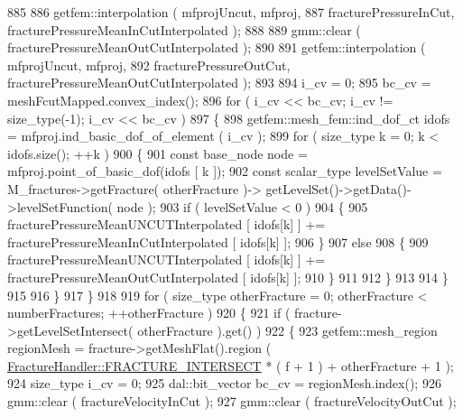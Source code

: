 \begin{DoxyCode}
885 
886                 getfem::interpolation ( mfprojUncut, mfproj,
887                                         fracturePressureInCut, fracturePressureMeanInCutInterpolated );
888 
889                 gmm::clear ( fracturePressureMeanOutCutInterpolated );
890 
891                 getfem::interpolation ( mfprojUncut, mfproj,
892                                         fracturePressureOutCut, fracturePressureMeanOutCutInterpolated );
893 
894                 i\_cv = 0;
895                 bc\_cv = meshFcutMapped.convex\_index();
896                 \textcolor{keywordflow}{for} ( i\_cv << bc\_cv; i\_cv != size\_type(-1); i\_cv << bc\_cv )
897                 \{
898                     getfem::mesh\_fem::ind\_dof\_ct idofs = mfproj.ind\_basic\_dof\_of\_element ( i\_cv );
899                     \textcolor{keywordflow}{for} ( size\_type k = 0; k < idofs.size(); ++k )
900                     \{
901                         \textcolor{keyword}{const} base\_node node = mfproj.point\_of\_basic\_dof(idofs [ k ]);
902                         \textcolor{keyword}{const} scalar\_type levelSetValue = M\_fractures->getFracture( otherFracture )->
      getLevelSet()->getData()->levelSetFunction( node );
903                         \textcolor{keywordflow}{if} ( levelSetValue < 0 )
904                         \{
905                             fracturePressureMeanUNCUTInterpolated [ idofs[k] ] += 
      fracturePressureMeanInCutInterpolated [ idofs[k] ];
906                         \}
907                         \textcolor{keywordflow}{else}
908                         \{
909                             fracturePressureMeanUNCUTInterpolated [ idofs[k] ] += 
      fracturePressureMeanOutCutInterpolated [ idofs[k] ];
910                         \}
911 
912                     \}
913 
914                 \}
915 
916             \}
917         \}
918         
919         \textcolor{keywordflow}{for} ( size\_type otherFracture = 0; otherFracture < numberFractures; ++otherFracture )
920         \{
921             \textcolor{keywordflow}{if} ( fracture->getLevelSetIntersect( otherFracture ).get() )
922             \{
923                 getfem::mesh\_region regionMesh = fracture->getMeshFlat().region ( 
      \hyperlink{classFractureHandler_a495ad4fc72d0c47c8f0424842f1153aaa781cae3f3b99bf9357fed2833d315537}{FractureHandler::FRACTURE\_INTERSECT} * ( f + 1 ) + otherFracture + 1 );
924                 size\_type i\_cv = 0;
925                 dal::bit\_vector bc\_cv = regionMesh.index();
926                 gmm::clear ( fractureVelocityInCut );
927                 gmm::clear ( fractureVelocityOutCut );

\end{DoxyCode}
